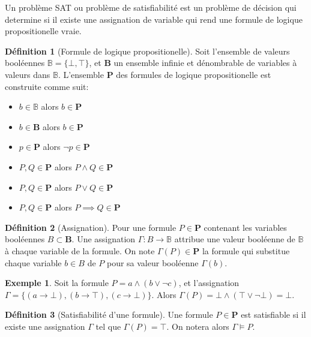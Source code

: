 \documentclass[french, 10pt, letterpaper]{article}
\theoremstyle{definition}
\newtheorem{definition}{Définition}[subsection]
\theoremstyle{proposition}
\theoremstyle{example}
\newtheorem{example}{Exemple}[definition]
\begin{document}
    Un problème SAT ou problème de satisfiabilité est un problème de décision qui determine si il existe une assignation de variable
    qui rend une formule de logique propositionelle vraie.

    \begin{definition}[Formule de logique propositionelle]
        Soit l'ensemble de valeurs booléennes $\mathbb{B} = \{\bot, \top\}$, et $\mathbf{B}$ un ensemble infinie et dénombrable de variables à valeurs dans $\mathbb{B}$.
        L'ensemble $\mathbf{P}$ des formules de logique propositionelle est construite comme suit:
        \begin{itemize}
            \item $b \in \mathbb{B}$ alors $b \in \mathbf{P}$
            \item $b \in \mathbf{B}$ alors $b \in \mathbf{P}$
            \item $p \in \mathbf{P}$ alors $\lnot p \in \mathbf{P}$
            \item $P, Q \in \mathbf{P}$ alors $P \land Q \in \mathbf{P}$
            \item $P, Q \in \mathbf{P}$ alors $P \lor Q \in \mathbf{P}$
            \item $P, Q \in \mathbf{P}$ alors $P \implies Q \in \mathbf{P}$
        \end{itemize}
    \end{definition}

    \begin{definition}[Assignation]
        Pour une formule $P \in \mathbf{P}$ contenant les variables booléennes $B \subset \mathbf{B}$.
        Une assignation $\Gamma : B \rightarrow \mathbb{B}$ attribue une valeur booléenne de $\mathbb{B}$ à chaque variable de la formule.
        On note $\Gamma(P) \in \mathbf{P}$ la formule qui substitue chaque variable $b \in B$ de $P$ pour sa valeur booléenne $\Gamma(b)$.
    \end{definition}
    \begin{example}
        Soit la formule $P = a \land (b \lor \lnot c)$, et l'assignation $\Gamma = \{(a \rightarrow \bot), (b \rightarrow \top), (c \rightarrow \bot)\}$.
        Alors $\Gamma(P) = \bot \land (\top \lor \lnot \bot) = \bot$.
    \end{example}

    \begin{definition}[Satisfiabilité d'une formule]
        Une formule $P \in \mathbf{P}$ est satisfiable si il existe une assignation $\Gamma$ tel que $\Gamma(P) = \top$.
        On notera alors $\Gamma \vDash P$.
    \end{definition}
\end{document}

